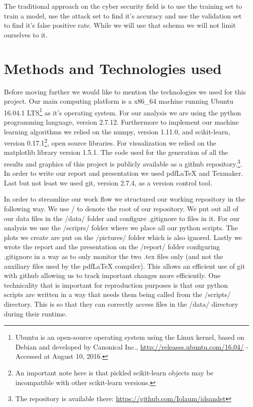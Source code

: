 \documentclass[reqno,openany,12pt]{amsbook}
\begin{document}
The traditional approach on the cyber security field is to use the training set to train a model, use the attack set to find it's accuracy and use the validation set to find it's false positive rate. While we will use that schema we will not limit ourselves to it.

\section{Methods and Technologies used}

Before moving further we would like to mention the technologies we used for this project. Our main computing platform is a x86\_{}64 machine running Ubuntu 16.04.1 LTS\footnote{Ubuntu is an open-source operating system using the Linux kernel, based on Debian and developed by Canonical Inc., \url{http://releases.ubuntu.com/16.04/} - Accessed at August 10, 2016.} as it's operating system. For our analysis we are using the python\cite{pyt} programming language, version 2.7.12. Furthermore to implement our machine learning algorithms we relied on the numpy\cite{numpy}, version 1.11.0, and scikit-learn\cite{skl}, version 0.17.1\footnote{An important note here is that pickled scikit-learn objects may be incompatible with other scikit-learn versions.}, open source libraries. For visualization we relied on the matplotlib\cite{matpl} library version 1.5.1. The code used for the generation of all the results and graphics of this project is publicly available as a github repository.\footnote{The repository is available there: \url{https://github.com/Iolaum/idsandet}}. In order to write our report and presentation we used pdfLaTeX and Texmaker. Last but not least we used git, version 2.7.4, as a version control tool.


In order to streamline our work flow we structured our working repository in the following way. We use / to denote the root of our repository. We put out all of our data files in the /data/ folder and configure .gitignore to files in it. For our analysis we use the /scriprs/ folder where we place all our python scripts. The plots we create are put on the /pictures/ folder which is also ignored. Lastly we wrote the report and the presentation on the /report/ folder configuring .gitignore in a way as to only monitor the two .tex files only (and not the auxiliary files used by the pdfLaTeX compiler). This allows an efficient use of git with github allowing us to track important changes more efficiently. One technicality that is important for reproduction purposes is that our python scripts are written in a way that needs them being called from the /scripts/ directory. This is so that they can correctly access files in the /data/ directory during their runtime.
\end{document}
